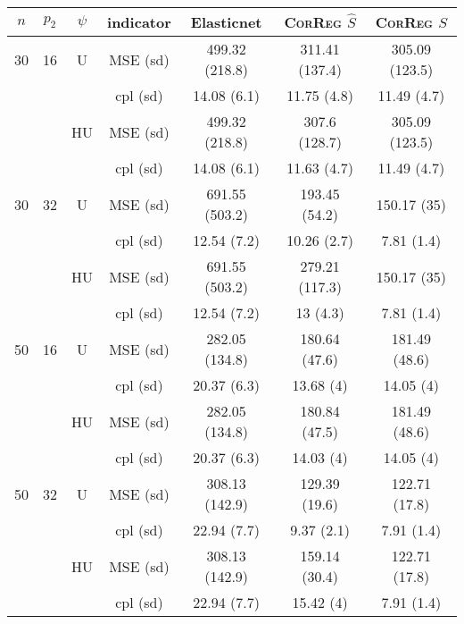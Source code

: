 \documentclass[11pt,a4paper]{article}
\begin{document}
\begin{table}[h!]
\centering
\begin{tabular}{|c|c|c|c|c|c|c|}
\hline 
$n$ & $p_2$&  $\psi$ &indicator & Elasticnet  &    \textsc{CorReg} $\hat S$& \textsc{CorReg} $S$\\ 
\hline %
30 & 16 & U&MSE (sd) & 499.32 (218.8) & 311.41 (137.4) & 305.09 (123.5) \\
& & & cpl (sd) & 14.08 (6.1) & 11.75 (4.8) & 11.49 (4.7) \\
 &  &HU &MSE (sd) & 499.32 (218.8) & 307.6 (128.7) & 305.09 (123.5) \\
& & & cpl (sd) & 14.08 (6.1) & 11.63 (4.7) & 11.49 (4.7) \\
\hline %
30 & 32 & U & MSE (sd) & 691.55 (503.2) & 193.45 (54.2) & 150.17 (35) \\
& & & cpl (sd) & 12.54 (7.2) & 10.26 (2.7) & 7.81 (1.4) \\
 &  & HU & MSE (sd) & 691.55 (503.2) & 279.21 (117.3) & 150.17 (35) \\
& & & cpl (sd) & 12.54 (7.2) & 13 (4.3) & 7.81 (1.4) \\
\hline
\hline %
50 & 16 & U&	MSE (sd) & 282.05 (134.8) & 180.64 (47.6) & 181.49 (48.6) \\
& & & cpl (sd) & 20.37 (6.3) & 13.68 (4) & 14.05 (4) \\
 &  &HU &MSE (sd) & 282.05 (134.8) & 180.84 (47.5) & 181.49 (48.6) \\
& & & cpl (sd) & 20.37 (6.3) & 14.03 (4) & 14.05 (4) \\
\hline %
50 & 32 & U&MSE (sd) & 308.13 (142.9) & 129.39 (19.6) & 122.71 (17.8) \\
& & & cpl (sd) & 22.94 (7.7) & 9.37 (2.1) & 7.91 (1.4) \\
 &  &HU &MSE (sd) & 308.13 (142.9) & 159.14 (30.4) & 122.71 (17.8) \\
& & &cpl (sd) & 22.94 (7.7) & 15.42 (4) & 7.91 (1.4) \\

\end{tabular}
\end{table}
\end{document}

